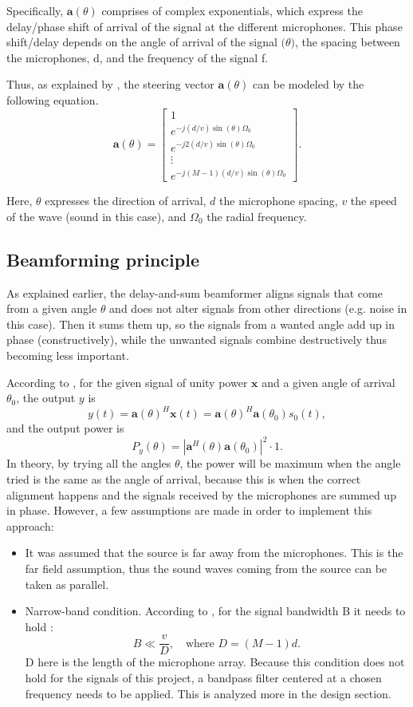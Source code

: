 Specifically, \( \mathbf{a}(\theta) \) comprises of complex exponentials, which express the delay/phase shift of arrival of the signal at the different microphones. This phase shift/delay depends on the angle of arrival of the signal \( \mathbf(\theta) \), the spacing between the microphones, d, and the frequency of the signal f. 


Thus, as explained by \cite{IP3Man}, the steering vector \( \mathbf{a}(\theta) \) can be modeled by the following equation.
\[
 \mathbf{a}(\theta) = \begin{bmatrix}
1 \\
e^{-j(d/v)\sin(\theta)\Omega_0} \\
e^{-j2(d/v)\sin(\theta)\Omega_0} \\
\vdots \\
e^{-j(M-1)(d/v)\sin(\theta)\Omega_0}
\end{bmatrix}.
\]
\label{steering_vector_calculation}

Here, $\theta$ expresses the direction of arrival, $d$ the microphone spacing, $v$ the speed of the wave (sound in this case), and $\Omega_0$ the radial frequency.

\subsection{Beamforming principle}\label{beamf_p}
As explained earlier, the delay-and-sum beamformer aligns signals that come from a given angle $\theta$ and does not alter signals from other directions (e.g. noise in this case). Then it sums them up, so the signals from a wanted angle add up in phase (constructively), while the unwanted signals combine destructively thus becoming less important.

According to \cite{IP3Man}, for the given signal of unity power $\mathbf{x}$ and a given angle of arrival $\theta_0$, the output $y$ is
\[
y(t) = \mathbf{a}(\theta)^H \mathbf{x}(t) = \mathbf{a}(\theta)^H \mathbf{a}(\theta_0) s_0(t),
\]
and the output power is
\[
P_y(\theta) = \left| \mathbf{a}^H(\theta)\mathbf{a}(\theta_0) \right|^2 \cdot 1.
\]
In theory, by trying all the angles $\theta$, the power will be maximum when the angle tried is the same as the angle of arrival, because this is when the correct alignment happens and the signals received by the microphones are summed up in phase. However, a few assumptions are made in order to implement this approach:


\begin{itemize}
    \item It was assumed that the source is far away from the microphones. This is the far field assumption, thus the sound waves coming from the source can be taken as parallel.
    
    \item Narrow-band condition. According to \cite{IP3Man}, for the signal bandwidth B it needs to hold : \[
    B \ll \frac{v}{D}, \quad \text{where } D = (M-1)d.
    \] D here is the length of the microphone array. Because this condition does not hold for the signals of this project, a bandpass filter centered at a chosen frequency needs to be applied. This is analyzed more in the design section.
\end{itemize}

